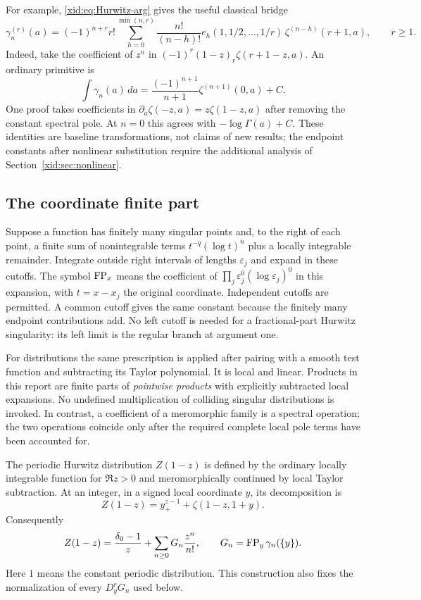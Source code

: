 For example, \eqref{xid:eq:Hurwitz-arg} gives the useful classical bridge
\begin{equation}\label{xid:eq:Stieltjes-arg-zeta}
 \gamma_n^{(r)}(a)=(-1)^{n+r}r!
 \sum_{h=0}^{\min(n,r)}\frac{n!}{(n-h)!}
 e_h(1,1/2,\ldots,1/r)\,
       \zeta^{(n-h)}(r+1,a),\qquad r\ge1.
\end{equation}
Indeed, take the coefficient of $z^n$ in
$(-1)^r(1-z)_r\zeta(r+1-z,a)$. An ordinary primitive is
\begin{equation}\label{xid:eq:ordinary-Stieltjes-primitive}
 \int\gamma_n(a)\,da
       =\frac{(-1)^{n+1}}{n+1}\zeta^{(n+1)}(0,a)+C.
\end{equation}
One proof takes coefficients in
$\partial_a\zeta(-z,a)=z\zeta(1-z,a)$ after removing the constant
spectral pole. At $n=0$ this agrees with $-\log\Gamma(a)+C$.
These identities are baseline transformations, not claims of new
results; the endpoint constants after nonlinear substitution require
the additional analysis of Section~\ref{xid:sec:nonlinear}.

\subsection{The coordinate finite part}

Suppose a function has finitely many singular points and, to the right
of each point, a finite sum of nonintegrable terms
$t^{-q}(\log t)^n$ plus a locally integrable remainder. Integrate
outside right intervals of lengths $\varepsilon_j$ and expand in these
cutoffs. The symbol $\operatorname{FP}_x$ means the coefficient of
$\prod_j\varepsilon_j^0(\log\varepsilon_j)^0$ in this expansion,
with $t=x-x_j$ the original coordinate. Independent cutoffs are
permitted. A common cutoff gives the same constant because the finitely
many endpoint contributions add. No left cutoff is needed for a
fractional-part Hurwitz singularity: its left limit is the regular
branch at argument one.

For distributions the same prescription is applied after pairing with
a smooth test function and subtracting its Taylor polynomial. It is
local and linear. Products in this report are finite parts of
\emph{pointwise products} with explicitly subtracted local expansions.
No undefined multiplication of colliding singular distributions is
invoked. In contrast, a coefficient of a meromorphic family is a
spectral operation; the two operations coincide only after the required
complete local pole terms have been accounted for.

The periodic Hurwitz distribution $Z(1-z)$ is defined by the ordinary
locally integrable function for $\Re z>0$ and meromorphically continued
by local Taylor subtraction. At an integer, in a signed local
coordinate $y$, its decomposition is
\[
 Z(1-z)=y_+^{z-1}+\zeta(1-z,1+y).
\]
Consequently
\begin{equation}\label{xid:eq:canonical-periodic}
 Z(1-z)=\frac{\delta_0-1}{z}
       +\sum_{n\ge0}G_n\frac{z^n}{n!},
 \qquad G_n=\operatorname{FP}_y\gamma_n(\{y\}).
\end{equation}
Here $1$ means the constant periodic distribution. This construction
also fixes the normalization of every $D_y^rG_n$ used below.


